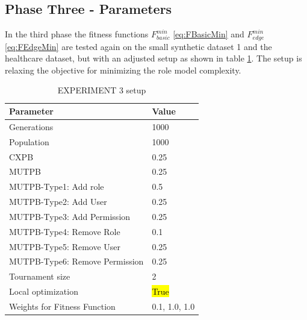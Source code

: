 \subsection{Phase Three - Parameters}
\label{sec:phase3}
In the third phase the fitness functions $F_{basic}^{min}$ \eqref{eq:FBasicMin} and $F_{edge}^{min}$ \eqref{eq:FEdgeMin} are tested again on the small synthetic dataset 1 and the healthcare dataset, but with an adjusted setup as shown in table \ref{tab:setup3}. The setup is relaxing the objective for minimizing the role model complexity.\\
\begin{table}[H]
    \centering
    \begin{tabular}{|l|l|}
        \hline
        \rowcolor{myGray} 
        \textbf{Parameter}              & \textbf{Value}    \\ \hline
        Generations                     & 1000              \\ \hline
        Population                      & 1000              \\ \hline
        CXPB                            & 0.25              \\ \hline
        MUTPB                           & 0.25              \\ \hline
        MUTPB-Type1: Add role           & 0.5               \\ \hline
        MUTPB-Type2: Add User           & 0.25              \\ \hline
        MUTPB-Type3: Add Permission     & 0.25              \\ \hline
        MUTPB-Type4: Remove Role        & 0.1               \\ \hline
        MUTPB-Type5: Remove User        & 0.25              \\ \hline
        MUTPB-Type6: Remove Permission  & 0.25              \\ \hline
        Tournament size                 & 2                 \\ \hline
        Local optimization              & \hl{True}         \\ \hline
        Weights for Fitness Function    & 0.1, 1.0, 1.0     \\ \hline
    \end{tabular}
    \caption{EXPERIMENT 3 setup}
    \label{tab:setup3}
\end{table}

